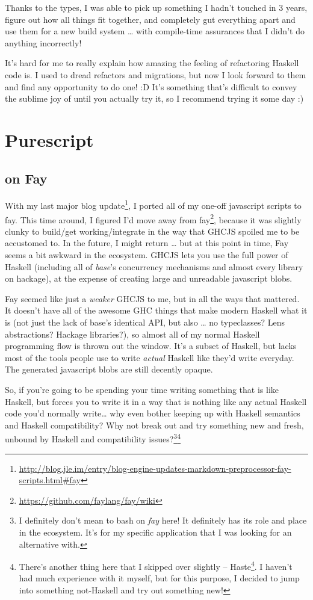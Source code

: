 \documentclass[]{article}
\renewcommand{\href}[2]{#2\footnote{\url{#1}}}
\begin{document}
Thanks to the types, I was able to pick up something I hadn't touched in 3
years, figure out how all things fit together, and completely gut everything
apart and use them for a new build system \ldots{} with compile-time assurances
that I didn't do anything incorrectly!

It's hard for me to really explain how amazing the feeling of refactoring
Haskell code is. I used to dread refactors and migrations, but now I look
forward to them and find any opportunity to do one! :D It's something that's
difficult to convey the sublime joy of until you actually try it, so I recommend
trying it some day :)

\section{Purescript}\label{purescript}

\subsection{on Fay}\label{on-fay}

With my
\href{http://blog.jle.im/entry/blog-engine-updates-markdown-preprocessor-fay-scripts.html\#fay}{last
major blog update}, I ported all of my one-off javascript scripts to fay. This
time around, I figured I'd move away from
\href{https://github.com/faylang/fay/wiki}{fay}, because it was slightly clunky
to build/get working/integrate in the way that GHCJS spoiled me to be accustomed
to. In the future, I might return \ldots{} but at this point in time, Fay seems
a bit awkward in the ecosystem. GHCJS lets you use the full power of Haskell
(including all of \emph{base}'s concurrency mechanisms and almost every library
on hackage), at the expense of creating large and unreadable javascript blobs.

Fay seemed like just a \emph{weaker} GHCJS to me, but in all the ways that
mattered. It doesn't have all of the awesome GHC things that make modern Haskell
what it is (not just the lack of base's identical API, but also \ldots{} no
typeclasses? Lens abstractions? Hackage libraries?), so almost all of my normal
Haskell programming flow is thrown out the window. It's a subset of Haskell, but
lacks most of the tools people use to write \emph{actual} Haskell like they'd
write everyday. The generated javascript blobs are still decently opaque.

So, if you're going to be spending your time writing something that is like
Haskell, but forces you to write it in a way that is nothing like any actual
Haskell code you'd normally write\ldots{} why even bother keeping up with
Haskell semantics and Haskell compatibility? Why not break out and try something
new and fresh, unbound by Haskell and compatibility issues?\footnote{I
  definitely don't mean to bash on \emph{fay} here! It definitely has its role
  and place in the ecosystem. It's for my specific application that I was
  looking for an alternative with.}\footnote{There's another thing here that I
  skipped over slightly -- \href{http://haste-lang.org/}{Haste}. I haven't had
  much experience with it myself, but for this purpose, I decided to jump into
  something not-Haskell and try out something new!}
\end{document}
